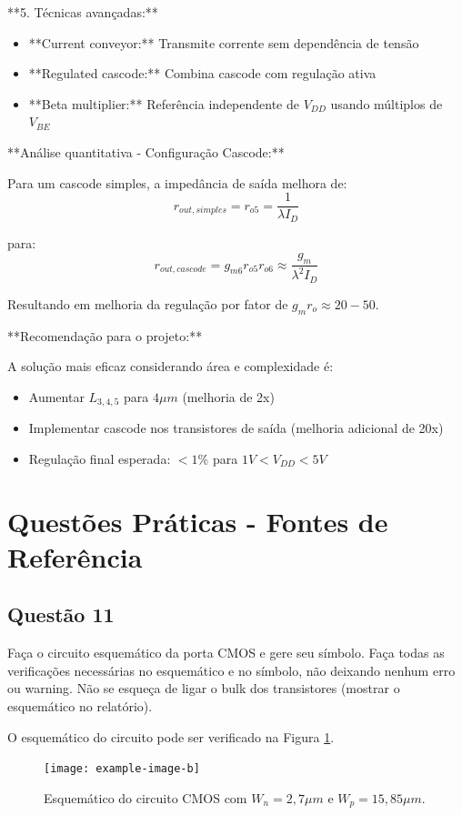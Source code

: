 \documentclass[12pt,a4paper]{article}
\begin{document}
**5. Técnicas avançadas:**
\begin{itemize}
    \item **Current conveyor:** Transmite corrente sem dependência de tensão
    \item **Regulated cascode:** Combina cascode com regulação ativa
    \item **Beta multiplier:** Referência independente de $V_{DD}$ usando múltiplos de $V_{BE}$
\end{itemize}

**Análise quantitativa - Configuração Cascode:**

Para um cascode simples, a impedância de saída melhora de:
$$r_{out,simples} = r_{o5} = \frac{1}{\lambda I_D} $$

para:
$$r_{out,cascode} = g_{m6} r_{o5} r_{o6} \approx \frac{g_m}{\lambda^2 I_D} $$

Resultando em melhoria da regulação por fator de $g_m r_o \approx 20-50$.

**Recomendação para o projeto:**

A solução mais eficaz considerando área e complexidade é:
\begin{itemize}
    \item Aumentar $L_{3,4,5}$ para $4\mu m$ (melhoria de 2x)
    \item Implementar cascode nos transistores de saída (melhoria adicional de 20x)
    \item Regulação final esperada: $< 1\%$ para $1V < V_{DD} < 5V$
\end{itemize}

\section{Questões Práticas - Fontes de Referência}

\subsection*{Questão 11}

Faça o circuito esquemático da porta CMOS e gere seu símbolo. Faça todas as verificações necessárias no esquemático e no símbolo, não deixando nenhum erro ou warning. Não se esqueça de ligar o bulk dos transistores (mostrar o esquemático no relatório).

O esquemático do circuito pode ser verificado na Figura \ref{fig:cmos_schematic}.

\begin{figure}[H]
    \centering
    \texttt{[image: example-image-b]}
    \caption{Esquemático do circuito CMOS com $W_n = 2,7 \mu m$ e $W_p = 15,85 \mu m$.}
    \label{fig:cmos_schematic}
\end{figure}
\end{document}
